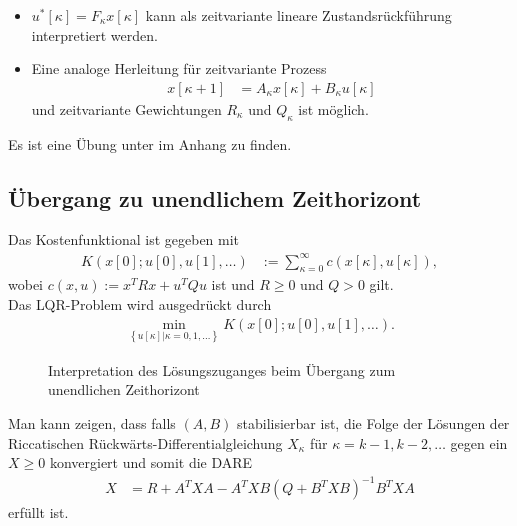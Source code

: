 \begin{remark}\hspace{1mm}
\begin{itemize}
  \item $u^{\ast}[\kappa]=F_{\kappa}x[\kappa]$ kann als zeitvariante lineare Zustandsrückführung interpretiert werden. 
  \item Eine analoge Herleitung für zeitvariante Prozess
  \begin{align*}
  	x[\kappa + 1] & = A_{\kappa}x[\kappa] + B_{\kappa}u[\kappa]
  \end{align*}
  und zeitvariante Gewichtungen $R_{\kappa}$ und $Q_{\kappa}$ ist möglich.
\end{itemize}
\end{remark}
Es ist eine Übung unter  im Anhang zu finden.

\subsection{Übergang zu unendlichem Zeithorizont}
Das Kostenfunktional ist gegeben mit
\begin{align}
	K\left(x[0];u[0],u[1],\ldots \right) & := \sum\limits_{\kappa=0}^{\infty}c\left(x[\kappa],u[\kappa] \right),
\end{align}
wobei $c(x,u):=x^TRx + u^TQu$ ist und $R\geq 0$ und $Q>0$ gilt.\\
Das \ac{LQR}-Problem wird ausgedrückt durch
\begin{align*}
	\min\limits_{\left\{u[\kappa]|\kappa=0,1,\ldots \right\}} K\left(x[0];u[0],u[1],\ldots \right).
\end{align*} 
\begin{figure}[htb]
	\centering
	
	\caption{Interpretation des Lösungszuganges beim Übergang zum unendlichen Zeithorizont}
	\label{fig:kap_3_loesungszugang}
\end{figure}
Man kann zeigen, dass falls $(A,B)$ stabilisierbar ist, die Folge der Lösungen der Riccatischen Rückwärts-Differentialgleichung $X_{\kappa}$ für $\kappa=k-1,k-2,\ldots$ gegen ein $X\geq
0$ konvergiert und somit die
\ac{DARE} 
\begin{align*}
	X & = R + A^TXA - A^TXB\left(Q + B^TXB \right)^{-1}B^TXA
\end{align*}
erfüllt ist. 


